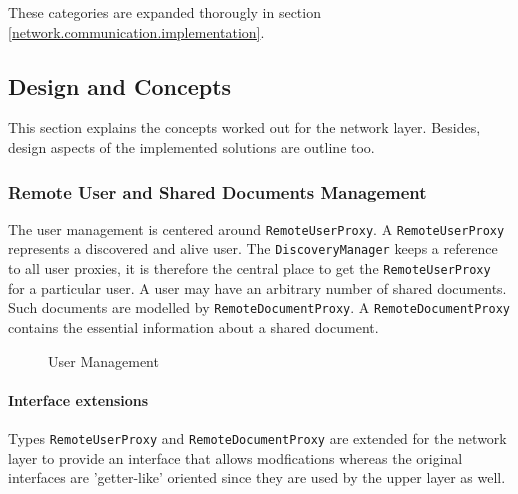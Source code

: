These categories are expanded thorougly in section \ref{network.communication.implementation}.

\subsection{Design and Concepts}
This section explains the concepts worked out for the network layer. Besides, design aspects of the implemented solutions are outline too.

\subsubsection{Remote User and Shared Documents Management}
The user management is centered around \texttt{RemoteUserProxy}. A  \texttt{Remote\-User\-Proxy} represents a discovered and alive user. The  \texttt{DiscoveryManager} keeps a reference to all user proxies, it is therefore the central place to get the  \texttt{RemoteUserProxy} for a particular user. A user may have an arbitrary number of shared documents. Such documents are modelled by  \texttt{RemoteDocumentProxy}. A  \texttt{RemoteDocumentProxy} contains the essential information about a shared document.

\begin{figure}[H]
 \centering
 \caption{User Management}
 \label{fig:network.discovery.usermanagement}
\end{figure}

\paragraph{Interface extensions}
Types  \texttt{RemoteUserProxy}  and  \texttt{RemoteDocumentProxy} are extended for the network layer to provide an interface that allows modfications whereas the original interfaces are 'getter-like' oriented since they are used by the upper layer as well.

